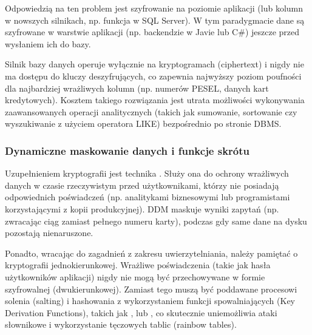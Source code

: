 \documentclass[letterpaper,10pt,polish]{sphinxmanual}
\begin{document}
\sphinxAtStartPar
Odpowiedzią na ten problem jest szyfrowanie na poziomie aplikacji (lub kolumn w nowszych silnikach, np. funkcja  w SQL Server). W tym paradygmacie dane są szyfrowane w warstwie aplikacji (np. backendzie w Javie lub C\#) jeszcze przed wysłaniem ich do bazy.

\sphinxAtStartPar
Silnik bazy danych operuje wyłącznie na kryptogramach (ciphertext) i nigdy nie ma dostępu do kluczy deszyfrujących, co zapewnia najwyższy poziom poufności dla najbardziej wrażliwych kolumn (np. numerów PESEL, danych kart kredytowych). Kosztem takiego rozwiązania jest utrata możliwości wykonywania zaawansowanych operacji analitycznych (takich jak sumowanie, sortowanie czy wyszukiwanie z użyciem operatora LIKE) bezpośrednio po stronie DBMS.


\subsubsection{Dynamiczne maskowanie danych i funkcje skrótu}
\label{\detokenize{rozdzia_u0142_2/rozdzia_u0142_27/rozdzial_4:dynamiczne-maskowanie-danych-i-funkcje-skrotu}}
\sphinxAtStartPar
Uzupełnieniem kryptografii jest technika . Służy ona do ochrony wrażliwych danych w czasie rzeczywistym przed użytkownikami, którzy nie posiadają odpowiednich poświadczeń (np. analitykami biznesowymi lub programistami korzystającymi z kopii produkcyjnej). DDM maskuje wyniki zapytań (np. zwracając ciąg  zamiast pełnego numeru karty), podczas gdy same dane na dysku pozostają nienaruszone.

\sphinxAtStartPar
Ponadto, wracając do zagadnień z zakresu uwierzytelniania, należy pamiętać o kryptografii jednokierunkowej. Wrażliwe poświadczenia (takie jak hasła użytkowników aplikacji) nigdy nie mogą być przechowywane w formie szyfrowalnej (dwukierunkowej). Zamiast tego muszą być poddawane procesowi solenia (salting) i hashowania z wykorzystaniem funkcji spowalniających (Key Derivation Functions), takich jak ,  lub , co skutecznie uniemożliwia ataki słownikowe i wykorzystanie tęczowych tablic (rainbow tables).

\sphinxstepscope
\end{document}

